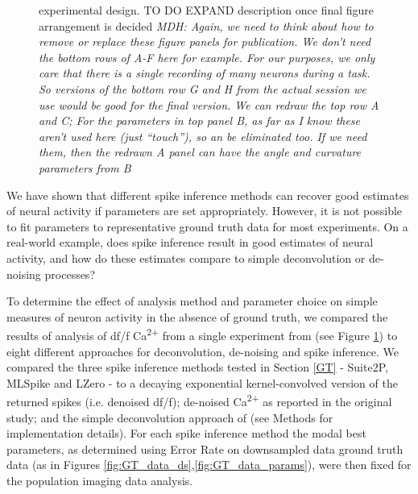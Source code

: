 \documentclass[a4paper,10pt,twocolumn]{article}
\begin{document}
\begin{figure}[h!]
        \caption{\label{fig:peron_setup} \citep{Peron2015-qz} experimental design. TO DO EXPAND description once final figure arrangement is decided 
        \emph{MDH: Again, we need to think about how to remove or replace these figure panels for publication.
        We don’t need  the bottom rows of A-F here for example. For our purposes, we only care that there is a single recording of many neurons during a task.
        So versions of the bottom row G and H from the actual session we use would be good for the final version.
        We can redraw the top row A and C; 
        For the parameters in top panel B, as far as I know these aren’t used here (just “touch”), so an be eliminated too. If we need them, then the redrawn A panel can have the angle and curvature parameters from B}}
\end{figure}

We have shown that different spike inference methods can recover good estimates of neural activity if parameters are set appropriately. However, it is not possible to fit parameters to representative ground truth data for most experiments. On a real-world example, does spike inference result in good estimates of neural activity, and how do these estimates compare to simple deconvolution or de-noising processes? 

To determine the effect of analysis method and parameter choice on simple measures of neuron activity in the absence of ground truth, we compared the results of analysis of df/f Ca\textsuperscript{2+}  from a single experiment from \citealt{Peron2015-qz} (see Figure \ref{fig:peron_setup}) to eight different approaches for deconvolution, de-noising and spike inference. We compared the three spike inference methods tested in Section \ref{GT} - Suite2P, MLSpike and LZero - to a decaying exponential kernel-convolved version of the returned spikes (i.e. denoised df/f); de-noised Ca\textsuperscript{2+} as reported in the original \citet{Peron2015-qz} study; and the simple deconvolution approach of \citet{Yaksi2006-ic} (see Methods for implementation details). For each spike inference method the modal best parameters, as determined using Error Rate on downsampled data ground truth data (as in Figures \ref{fig:GT_data_ds},\ref{fig:GT_data_params}), were then fixed for the population imaging data analysis.


\end{document}
